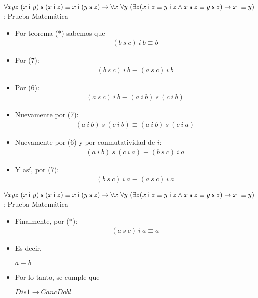 \documentclass[10pt]{beamer}
\newcommand{\Cfonti}{\fontsize{8.5}{7.2}\selectfont}
\newcommand{\acot}{Dis1\rightarrow CancDobl}
\newcommand{\idistr}{\forall xyz\;(x\;\mathsf{i}\
y)\;\mathsf{s}\;(x\;\mathsf{i}\;z)\equiv x\;\mathsf{i}\;(y\;\mathsf{s}%
\;z)}
\newcommand{\myconj}{x\;\mathsf{i}\;z\equiv y\;\mathsf{%
i}\;z\wedge x\;\mathsf{s}\;z\equiv y\;\mathsf{s}\;z}
\begin{document}
\begin{frame}{\Cfonti$\idistr \rightarrow \forall x\ \forall y\ (\exists z (\myconj) \rightarrow x\ \equiv y)$:
   Prueba Matemática}
  \begin{itemize}[<+->]

    \item Por teorema ($*$) sabemos que
      \begin{align}
        (b\ s\ c)\ i\ b \equiv b
      \end{align}
    \item Por (7):
      \begin{align}
        (b\ s\ c)\ i\ b \equiv (a\ s\ c)\ i\ b
      \end{align}
    \item Por (6):
      \begin{align}
        (a\ s\ c)\ i\ b \equiv (a\ i\ b)\ s\ (c\ i\ b)
      \end{align}
    \item Nuevamente por (7):
      \begin{align}
        (a\ i\ b)\ s\ (c\ i\ b) \equiv (a\ i\ b)\ s\ (c\ i\ a)
      \end{align}

    \item Nuevamente por (6) y por conmutatividad de $i$:
      \begin{align}
        (a\ i\ b)\ s\ (c\ i\ a) \equiv (b\ s\ c)\ i\ a
      \end{align}

    \item Y así, por (7):
      \begin{align}
        (b\ s\ c)\ i\ a \equiv (a\ s\ c)\ i\ a
      \end{align}

  \end{itemize}
\end{frame}


\begin{frame}{\Cfonti$\idistr \rightarrow \forall x\ \forall y\ (\exists z (\myconj) \rightarrow x\ \equiv y)$:
   Prueba Matemática}
  \begin{itemize}[<+->]

    \item Finalmente, por ($*$):
      \begin{align}
        (a\ s\ c)\ i\ a \equiv a
      \end{align}
    \item Es decir,
      \begin{center}
        $a \equiv b$
      \end{center}

    \item Por lo tanto, se cumple que
      \begin{center}
        $\acot$
      \end{center}

  \end{itemize}
\end{frame}
\end{document}

